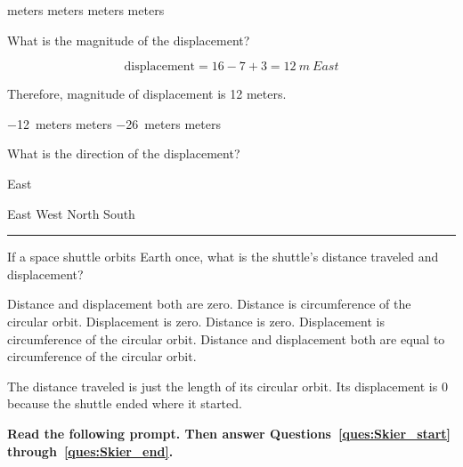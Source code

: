 \documentclass[answers]{exam}
\begin{document}
\begin{questions}
\begin{questions}
\begin{choices}
 meters
 meters
 meters
 meters
\end{choices}

\question
What is the magnitude of the displacement?

\begin{solution}
\begin{equation*}
  \mathrm{displacement} = 16 - 7 + 3 = \SI{12}{m \ East}  
\end{equation*}

Therefore, magnitude of displacement is 12 meters.
\end{solution}

\begin{choices}
\choice \SI{-12}{meters}
 meters
\choice \SI{-26}{meters}
 meters
\end{choices}

\question \label{ques:cat_end}
What is the direction of the displacement?

\begin{solution}
East
\end{solution}

\begin{choices}
\CorrectChoice East
\choice West
\choice North
\choice South
\end{choices}

\vspace{1em} \hrule

\question
If a space shuttle orbits Earth once, what is the shuttle’s distance traveled and displacement?

\begin{choices}
\choice Distance and displacement both are zero.
\CorrectChoice Distance is circumference of the circular orbit. Displacement is zero.
\choice Distance is zero. Displacement is circumference of the circular orbit.
\choice Distance and displacement both are equal to circumference of the circular orbit.
\end{choices}

\begin{solution}
The distance traveled is just the length of its circular orbit. Its displacement is 0 because the shuttle ended where it started.
\end{solution}

\begin{EnvUplevel}
\textbf{Read the following prompt. Then answer Questions~\ref{ques:Skier_start} through~\ref{ques:Skier_end}.}


\end{EnvUplevel}
\end{questions}
\end{questions}
\end{document}

